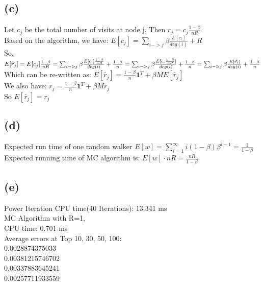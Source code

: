 \documentclass{article}
\begin{document}
\subsection{(c)}
Let $c_j$ be the total number of visits at node j, Then $r_j = c_j\frac{1-\beta}{nR}$\\
Based on the algorithm, we have: $E[c_j] = \sum_{i->j} \beta \frac{E[c_i]}{deg(i)} + R$ \\
So, $E[\tilde{r_j}] = E[c_j]\frac{1-\beta}{nR} = \sum_{i->j} \beta \frac{E[c_i]\frac{1-\beta}{nR}}{deg(i)} + \frac{1-\beta}{n} \\
= \sum_{i->j} \beta \frac{E[c_i\frac{1-\beta}{nR}]}{deg(i)} + \frac{1-\beta}{n} \\
= \sum_{i->j} \beta \frac{E[\tilde{r_i}]}{deg(i)} + \frac{1-\beta}{n}$ \\
Which can be re-written as: $E[\tilde{r_j}] = \frac{1-\beta}{n}\textbf{1}^T + \beta ME[\tilde{r_j}]$ \\
We also have: $r_j = \frac{1-\beta}{n}\textbf{1}^T + \beta Mr_j$ \\
So $E[\tilde{r_j}] = r_j$


\subsection{(d)}
Expected run time of one random walker $E[w] = \sum_{i=1}^{\infty}i(1-\beta)\beta^{i-1}=\frac{1}{1-\beta}$\\
Expected running time of MC algorithm is: $E[w]\cdot nR = \frac{nR}{1-\beta}$

\subsection{(e)}
Power Iteration CPU time(40 Iterations): 13.341 ms\\
MC Algorithm with R=1, \\
\indent CPU time: 0.701 ms\\
\indent Average errors at Top 10, 30, 50, 100:\\
0.0028874375033 \\
0.00381215746702\\
0.00337883645241\\
0.00257711933559\\
\end{document}
